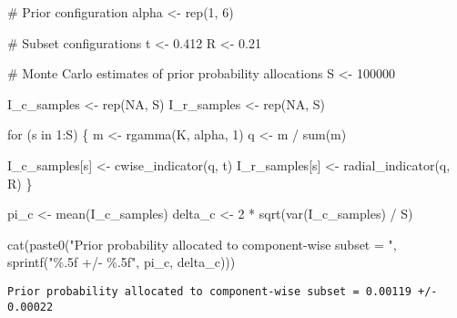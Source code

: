 \documentclass[
  letterpaper,
  DIV=11,
  numbers=noendperiod]{scrartcl}
\newenvironment{Shaded}{\begin{snugshade}}{\end{snugshade}}
\newcommand{\CommentTok}[1]{\textcolor[rgb]{0.37,0.37,0.37}{#1}}
\newcommand{\ConstantTok}[1]{\textcolor[rgb]{0.56,0.35,0.01}{#1}}
\newcommand{\ControlFlowTok}[1]{\textcolor[rgb]{0.00,0.23,0.31}{#1}}
\newcommand{\DecValTok}[1]{\textcolor[rgb]{0.68,0.00,0.00}{#1}}
\newcommand{\FloatTok}[1]{\textcolor[rgb]{0.68,0.00,0.00}{#1}}
\newcommand{\FunctionTok}[1]{\textcolor[rgb]{0.28,0.35,0.67}{#1}}
\newcommand{\NormalTok}[1]{\textcolor[rgb]{0.00,0.23,0.31}{#1}}
\newcommand{\OtherTok}[1]{\textcolor[rgb]{0.00,0.23,0.31}{#1}}
\newcommand{\SpecialCharTok}[1]{\textcolor[rgb]{0.37,0.37,0.37}{#1}}
\newcommand{\StringTok}[1]{\textcolor[rgb]{0.13,0.47,0.30}{#1}}
\begin{document}
\begin{Shaded}
\begin{Highlighting}[]
\CommentTok{\# Prior configuration}
\NormalTok{alpha }\OtherTok{\textless{}{-}} \FunctionTok{rep}\NormalTok{(}\DecValTok{1}\NormalTok{, }\DecValTok{6}\NormalTok{)}

\CommentTok{\# Subset configurations}
\NormalTok{t }\OtherTok{\textless{}{-}} \FloatTok{0.412}
\NormalTok{R }\OtherTok{\textless{}{-}} \FloatTok{0.21}

\CommentTok{\# Monte Carlo estimates of prior probability allocations}
\NormalTok{S }\OtherTok{\textless{}{-}} \DecValTok{100000}

\NormalTok{I\_c\_samples }\OtherTok{\textless{}{-}} \FunctionTok{rep}\NormalTok{(}\ConstantTok{NA}\NormalTok{, S)}
\NormalTok{I\_r\_samples }\OtherTok{\textless{}{-}} \FunctionTok{rep}\NormalTok{(}\ConstantTok{NA}\NormalTok{, S)}

\ControlFlowTok{for}\NormalTok{ (s }\ControlFlowTok{in} \DecValTok{1}\SpecialCharTok{:}\NormalTok{S) \{}
\NormalTok{  m }\OtherTok{\textless{}{-}} \FunctionTok{rgamma}\NormalTok{(K, alpha, }\DecValTok{1}\NormalTok{)}
\NormalTok{  q }\OtherTok{\textless{}{-}}\NormalTok{ m }\SpecialCharTok{/} \FunctionTok{sum}\NormalTok{(m)}

\NormalTok{  I\_c\_samples[s] }\OtherTok{\textless{}{-}} \FunctionTok{cwise\_indicator}\NormalTok{(q, t)}
\NormalTok{  I\_r\_samples[s] }\OtherTok{\textless{}{-}} \FunctionTok{radial\_indicator}\NormalTok{(q, R)}
\NormalTok{\}}
\end{Highlighting}
\end{Shaded}

\begin{Shaded}
\begin{Highlighting}[]
\NormalTok{pi\_c }\OtherTok{\textless{}{-}} \FunctionTok{mean}\NormalTok{(I\_c\_samples)}
\NormalTok{delta\_c }\OtherTok{\textless{}{-}} \DecValTok{2} \SpecialCharTok{*} \FunctionTok{sqrt}\NormalTok{(}\FunctionTok{var}\NormalTok{(I\_c\_samples) }\SpecialCharTok{/}\NormalTok{ S)}

\FunctionTok{cat}\NormalTok{(}\FunctionTok{paste0}\NormalTok{(}\StringTok{"Prior probability allocated to component{-}wise subset = "}\NormalTok{,}
           \FunctionTok{sprintf}\NormalTok{(}\StringTok{"\%.5f +/{-} \%.5f"}\NormalTok{, pi\_c, delta\_c)))}
\end{Highlighting}
\end{Shaded}

\begin{verbatim}
Prior probability allocated to component-wise subset = 0.00119 +/- 0.00022
\end{verbatim}
\end{document}
